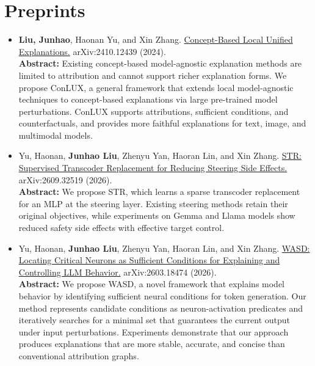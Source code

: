 \documentclass[letterpaper,11pt]{article}
\begin{document}
\section{Preprints}
\begin{itemize}[leftmargin=*]
    \item \textbf{Liu, Junhao}, Haonan Yu, and Xin Zhang. \href{https://arxiv.org/pdf/2410.12439}{Concept-Based Local Unified Explanations.} arXiv:2410.12439 (2024).\vspace{0.2cm}\\
        {\small \textbf{Abstract:} Existing concept-based model-agnostic explanation methods are limited to attribution and cannot support richer explanation forms. We propose ConLUX, a general framework that extends local model-agnostic techniques to concept-based explanations via large pre-trained model perturbations. ConLUX supports attributions, sufficient conditions, and counterfactuals, and provides more faithful explanations for text, image, and multimodal models.}

    \item Yu, Haonan, \textbf{Junhao Liu}, Zhenyu Yan, Haoran Lin, and Xin Zhang. \href{https://arxiv.org/abs/2609.32519}{STR: Supervised Transcoder Replacement for Reducing Steering Side Effects.} arXiv:2609.32519 (2026).\vspace{0.2cm}\\
        {\small \textbf{Abstract:} We propose STR, which learns a sparse transcoder replacement for an MLP at the steering layer. Existing steering methods retain their original objectives, while experiments on Gemma and Llama models show reduced safety side effects with effective target control.}

    \item Yu, Haonan, \textbf{Junhao Liu}, Zhenyu Yan, Haoran Lin, and Xin Zhang. \href{https://arxiv.org/abs/2603.18474}{WASD: Locating Critical Neurons as Sufficient Conditions for Explaining and Controlling LLM Behavior.} arXiv:2603.18474 (2026).\vspace{0.2cm}\\
        {\small \textbf{Abstract:} We propose WASD, a novel framework that explains model behavior by identifying sufficient neural conditions for token generation. Our method represents candidate conditions as neuron-activation predicates and iteratively searches for a minimal set that guarantees the current output under input perturbations. Experiments demonstrate that our approach produces explanations that are more stable, accurate, and concise than conventional attribution graphs.}
\end{itemize}
\end{document}
